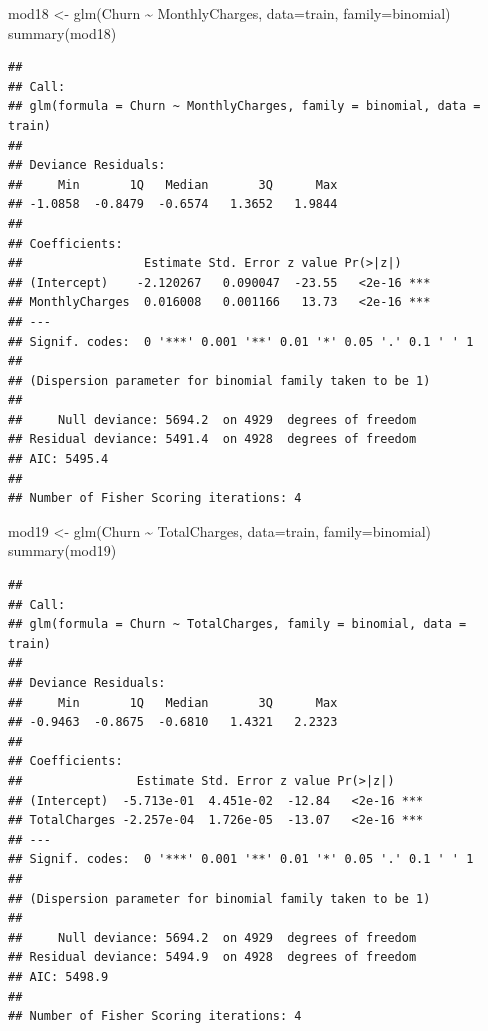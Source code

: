 \documentclass[
  twoside]{article}
\newenvironment{Shaded}{\begin{snugshade}}{\end{snugshade}}
\newcommand{\AttributeTok}[1]{\textcolor[rgb]{0.77,0.63,0.00}{#1}}
\newcommand{\FunctionTok}[1]{\textcolor[rgb]{0.00,0.00,0.00}{#1}}
\newcommand{\NormalTok}[1]{#1}
\newcommand{\OtherTok}[1]{\textcolor[rgb]{0.56,0.35,0.01}{#1}}
\newcommand{\SpecialCharTok}[1]{\textcolor[rgb]{0.00,0.00,0.00}{#1}}
\begin{document}
\begin{Shaded}
\begin{Highlighting}[]
\NormalTok{mod18 }\OtherTok{\textless{}{-}} \FunctionTok{glm}\NormalTok{(Churn }\SpecialCharTok{\textasciitilde{}}\NormalTok{ MonthlyCharges, }\AttributeTok{data=}\NormalTok{train, }\AttributeTok{family=}\NormalTok{binomial)}
\FunctionTok{summary}\NormalTok{(mod18)}
\end{Highlighting}
\end{Shaded}

\begin{verbatim}
## 
## Call:
## glm(formula = Churn ~ MonthlyCharges, family = binomial, data = train)
## 
## Deviance Residuals: 
##     Min       1Q   Median       3Q      Max  
## -1.0858  -0.8479  -0.6574   1.3652   1.9844  
## 
## Coefficients:
##                 Estimate Std. Error z value Pr(>|z|)    
## (Intercept)    -2.120267   0.090047  -23.55   <2e-16 ***
## MonthlyCharges  0.016008   0.001166   13.73   <2e-16 ***
## ---
## Signif. codes:  0 '***' 0.001 '**' 0.01 '*' 0.05 '.' 0.1 ' ' 1
## 
## (Dispersion parameter for binomial family taken to be 1)
## 
##     Null deviance: 5694.2  on 4929  degrees of freedom
## Residual deviance: 5491.4  on 4928  degrees of freedom
## AIC: 5495.4
## 
## Number of Fisher Scoring iterations: 4
\end{verbatim}

\begin{Shaded}
\begin{Highlighting}[]
\NormalTok{mod19 }\OtherTok{\textless{}{-}} \FunctionTok{glm}\NormalTok{(Churn }\SpecialCharTok{\textasciitilde{}}\NormalTok{ TotalCharges, }\AttributeTok{data=}\NormalTok{train, }\AttributeTok{family=}\NormalTok{binomial)}
\FunctionTok{summary}\NormalTok{(mod19)}
\end{Highlighting}
\end{Shaded}

\begin{verbatim}
## 
## Call:
## glm(formula = Churn ~ TotalCharges, family = binomial, data = train)
## 
## Deviance Residuals: 
##     Min       1Q   Median       3Q      Max  
## -0.9463  -0.8675  -0.6810   1.4321   2.2323  
## 
## Coefficients:
##                Estimate Std. Error z value Pr(>|z|)    
## (Intercept)  -5.713e-01  4.451e-02  -12.84   <2e-16 ***
## TotalCharges -2.257e-04  1.726e-05  -13.07   <2e-16 ***
## ---
## Signif. codes:  0 '***' 0.001 '**' 0.01 '*' 0.05 '.' 0.1 ' ' 1
## 
## (Dispersion parameter for binomial family taken to be 1)
## 
##     Null deviance: 5694.2  on 4929  degrees of freedom
## Residual deviance: 5494.9  on 4928  degrees of freedom
## AIC: 5498.9
## 
## Number of Fisher Scoring iterations: 4
\end{verbatim}
\end{document}
